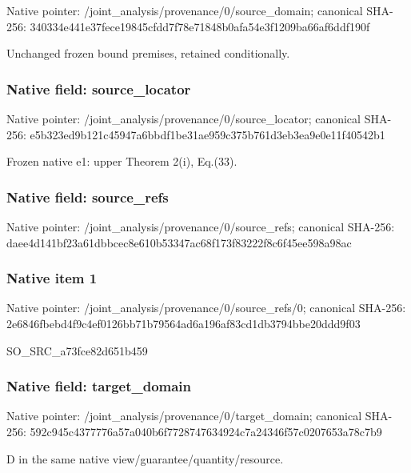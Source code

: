 \documentclass[10pt,a4paper]{article}
\begin{document}
Native pointer: /joint\_analysis/provenan\allowbreak{}ce/0/source\_domain; canonical SHA-256: 340334e441e37fece19845cf\allowbreak{}dd7f78e71848b0afa54e3f12\allowbreak{}09ba66af6ddf190f


Unchanged frozen bound premises, retained conditionally.


\subsubsection{Native field: source\_locator}


Native pointer: /joint\_analysis/provenan\allowbreak{}ce/0/source\_locator; canonical SHA-256: e5b323ed9b121c45947a6bbd\allowbreak{}f1be31ae959c375b761d3eb3\allowbreak{}ea9e0e11f40542b1


Frozen native e1: upper Theorem 2(i), Eq.(33).


\subsubsection{Native field: source\_refs}


Native pointer: /joint\_analysis/provenan\allowbreak{}ce/0/source\_refs; canonical SHA-256: daee4d141bf23a61dbbcec8e\allowbreak{}610b53347ac68f173f83222f\allowbreak{}8c6f45ee598a98ac



\subsubsection{Native item 1}


Native pointer: /joint\_analysis/provenan\allowbreak{}ce/0/source\_refs/0; canonical SHA-256: 2e6846fbebd4f9c4ef0126bb\allowbreak{}71b79564ad6a196af83cd1db\allowbreak{}3794bbe20ddd9f03


SO\_SRC\_a73fce82d651b459


\subsubsection{Native field: target\_domain}


Native pointer: /joint\_analysis/provenan\allowbreak{}ce/0/target\_domain; canonical SHA-256: 592c945c4377776a57a040b6\allowbreak{}f7728747634924c7a24346f5\allowbreak{}7c0207653a78c7b9


D in the same native view/guarantee/quantity/resource.
\end{document}
